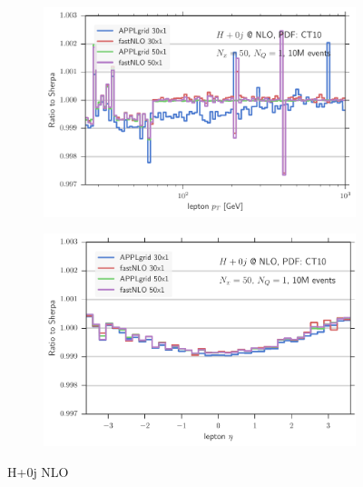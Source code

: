 \begin{figure}
\begin{subfigure}[]{0.49\textwidth}
	\includegraphics[width=\textwidth]{images/hnlo_lpt_50v30.pdf}
\end{subfigure}
\hfill
\begin{subfigure}[]{0.49\textwidth}
	\includegraphics[width=\textwidth]{images/hnlo_leta_50v30.pdf}
\end{subfigure}
\caption{H+0j NLO}
\end{figure}
%


